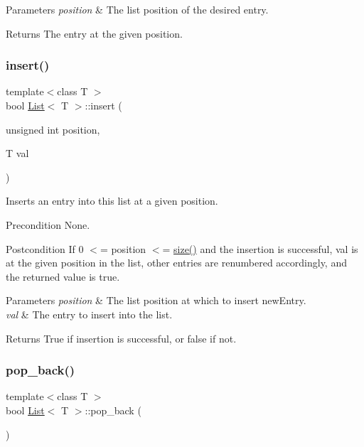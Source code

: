\begin{DoxyParams}{Parameters}
{\em position} & The list position of the desired entry. \\
\hline
\end{DoxyParams}
\begin{DoxyReturn}{Returns}
The entry at the given position. 
\end{DoxyReturn}
\mbox{\label{class_list_a9c20ddd34151f1fdf67549f3c94364da}} 
\subsubsection{\texorpdfstring{insert()}{insert()}}
{\footnotesize\ttfamily template$<$class T $>$ \\
bool \hyperlink{class_list}{List}$<$ T $>$\+::insert (\begin{DoxyParamCaption}\item[{unsigned int}]{position,  }\item[{T}]{val }\end{DoxyParamCaption})}

Inserts an entry into this list at a given position. \begin{DoxyPrecond}{Precondition}
None. 
\end{DoxyPrecond}
\begin{DoxyPostcond}{Postcondition}
If 0 $<$= position $<$= \hyperlink{class_list_aec8852ab225094e14ad424e8d71a4dac}{size()} and the insertion is successful, val is at the given position in the list, other entries are renumbered accordingly, and the returned value is true. 
\end{DoxyPostcond}

\begin{DoxyParams}{Parameters}
{\em position} & The list position at which to insert new\+Entry. \\
\hline
{\em val} & The entry to insert into the list. \\
\hline
\end{DoxyParams}
\begin{DoxyReturn}{Returns}
True if insertion is successful, or false if not. 
\end{DoxyReturn}
\mbox{\label{class_list_aa6ff98e23b4ceea509e3a29fa5ceecd7}} 
\subsubsection{\texorpdfstring{pop\+\_\+back()}{pop\_back()}}
{\footnotesize\ttfamily template$<$class T $>$ \\
bool \hyperlink{class_list}{List}$<$ T $>$\+::pop\+\_\+back (\begin{DoxyParamCaption}{ }\end{DoxyParamCaption})}

